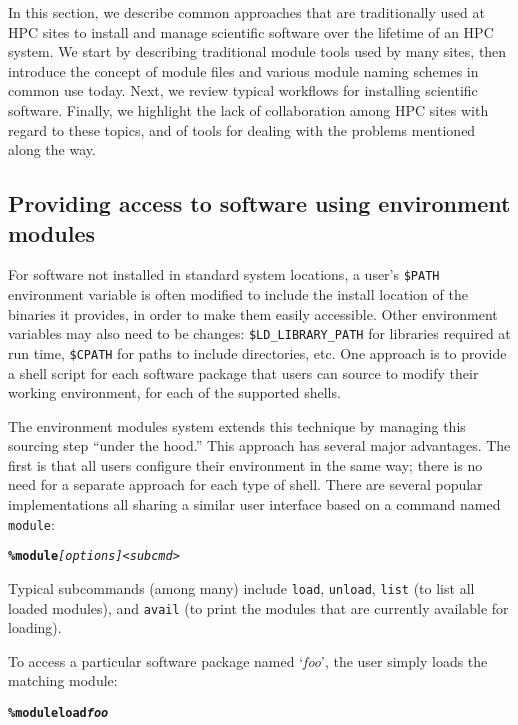 In this section, we describe common approaches that are traditionally used at HPC
sites to install and manage scientific software over the lifetime of an HPC system.
We start by describing traditional module tools used by many sites, then introduce
the concept of module files and various module naming schemes in common use today.
Next, we review typical workflows for installing scientific software. Finally,
we highlight the lack of collaboration among HPC sites with regard to these topics,
and of tools for dealing with the problems mentioned along the way.

\subsection{Providing access to software using environment modules}
\label{sec:env_modules_system}

For software not installed in standard system locations, a user's
\texttt{\small\$PATH} environment variable is often modified to include the install
location of the binaries it provides, in order to make them easily accessible.
Other environment variables may also need to be changes: 
\texttt{\small\$LD\_LIBRARY\_PATH} for libraries required at run time,
\texttt{\small\$CPATH} for paths to include directories, etc.
One approach is to provide a shell script for each software package that
users can source to modify their working environment, for each of the supported
shells.

The environment modules system extends this technique by managing this sourcing step ``under the hood.'' This approach has several major
advantages. The first is that all users configure their environment in the same way; there is no need for a
separate approach for each type of shell. There are several popular implementations
all sharing a similar
user interface based on a command named \texttt{\small module}:
{\small
\begin{alltt}
    \textbf{\% module} \emph{[options]} \emph{<subcmd>}\
\end{alltt}
}
\noindent
Typical subcommands (among many) include \texttt{\small load},
\texttt{\small unload}, \texttt{\small list} (to list all loaded
modules), and \texttt{\small avail} (to print the modules that are currently available for loading).

To access a particular software package named `\emph{foo}', the user simply
loads the matching module:
{\small
\begin{alltt}
    \textbf{\% module load \emph{foo}}\
\end{alltt}
}

